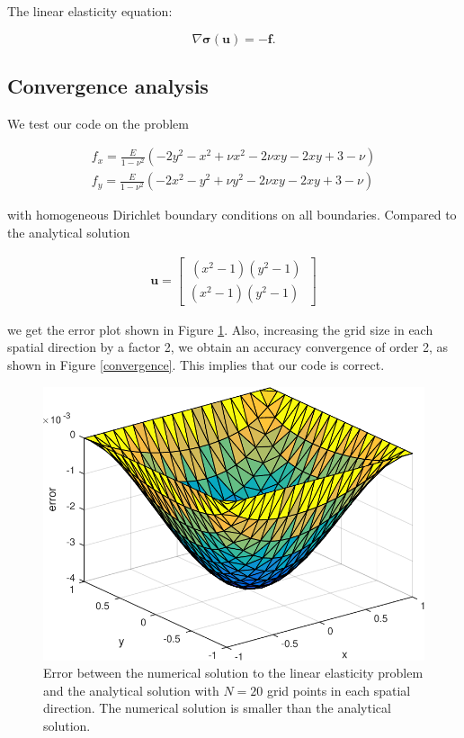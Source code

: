 

The linear elasticity equation:

\begin{equation}
\nabla \bm{\sigma}(\bm{u}) = - \bm{f}.
\end{equation}

\subsection{Convergence analysis}

We test our code on the problem 

\begin{align}
f_x = \frac{E}{1-\nu^2} (-2y^2 - x^2 + \nu x^2 - 2\nu xy -2xy + 3 - \nu) \\
f_y = \frac{E}{1-\nu^2} (-2x^2 - y^2 + \nu y^2 - 2\nu xy -2xy + 3 - \nu) 
\end{align}

with homogeneous Dirichlet boundary conditions on all boundaries. Compared to the analytical solution 

\begin{align}
\bm{u} = \begin{bmatrix}
\, (x^2-1)(y^2-1) \, \\
(x^2-1)(y^2-1)
\end{bmatrix}
\end{align}

we get the error plot shown in Figure \ref{error}. Also, increasing the grid size in each spatial direction by a factor 2, we obtain an accuracy convergence of order 2, as shown in Figure \ref{convergence}. This implies that our code is correct.

\begin{figure}
\center
\includegraphics[scale=0.5]{error_linEl}
\caption{Error between the numerical solution to the linear elasticity problem and the analytical solution with $N = 20$ grid points in each spatial direction. The numerical solution is smaller than the analytical solution.}
\label{error}
\end{figure}

